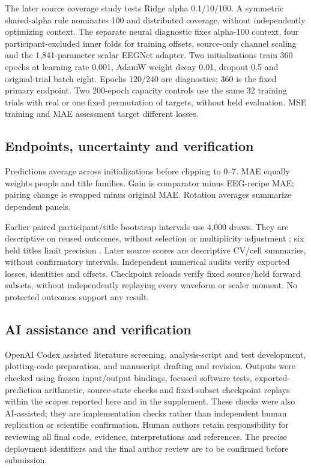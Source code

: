 \documentclass[10pt,letterpaper]{article}
\begin{document}
The later source coverage study tests Ridge alpha 0.1/10/100. A symmetric shared-alpha rule nominates 100 and distributed coverage, without independently optimizing context. The separate neural diagnostic fixes alpha-100 context, four participant-excluded inner folds for training offsets, source-only channel scaling and the 1,841-parameter scalar EEGNet adapter. Two initializations train 360 epochs at learning rate 0.001, AdamW weight decay 0.01, dropout 0.5 and original-trial batch eight. Epochs 120/240 are diagnostics; 360 is the fixed primary endpoint. Two 200-epoch capacity controls use the same 32 training trials with real or one fixed permutation of targets, without held evaluation. MSE training and MAE assessment target different losses.

\subsection{Endpoints, uncertainty and verification}
Predictions average across initializations before clipping to 0--7. MAE equally weights people and title families. Gain is comparator minus EEG-recipe MAE; pairing change is swapped minus original MAE. Rotation averages summarize dependent panels.

Earlier paired participant/title bootstrap intervals use 4,000 draws. They are descriptive on reused outcomes, without selection or multiplicity adjustment \cite{owen2007,owen2012}; six held titles limit precision \cite{westfall2014power}. Later source scores are descriptive CV/cell summaries, without confirmatory intervals. Independent numerical audits verify exported losses, identities and offsets. Checkpoint reloads verify fixed source/held forward subsets, without independently replaying every waveform or scaler moment. No protected outcomes support any result.

\subsection{AI assistance and verification}
OpenAI Codex assisted literature screening, analysis-script and test development, plotting-code preparation, and manuscript drafting and revision. Outputs were checked using frozen input/output bindings, focused software tests, exported-prediction arithmetic, source-state checks and fixed-subset checkpoint replays within the scopes reported here and in the supplement. These checks were also AI-assisted; they are implementation checks rather than independent human replication or scientific confirmation. Human authors retain responsibility for reviewing all final code, evidence, interpretations and references. The precise deployment identifiers and the final author review are to be confirmed before submission.
\end{document}
